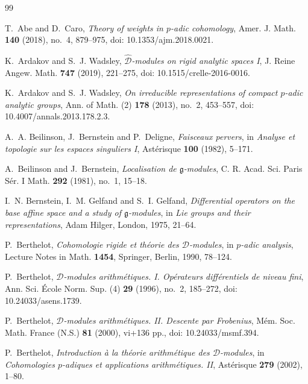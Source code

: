 \documentclass[11pt]{amsart}
\theoremstyle{plain}
\theoremstyle{definition}
\theoremstyle{remark}
\begin{document}
\begin{thebibliography}{99}


T.~Abe and D.~Caro,
\emph{Theory of weights in \(p\)-adic cohomology},
Amer. J. Math. \textbf{140} (2018), no.~4, 879--975,
doi: 10.1353/ajm.2018.0021.

K.~Ardakov and S.~J. Wadsley,
\emph{\(\widehat{\mathcal D}\)-modules on rigid analytic spaces I},
J. Reine Angew. Math. \textbf{747} (2019), 221--275,
doi: 10.1515/crelle-2016-0016.

K.~Ardakov and S.~J. Wadsley,
\emph{On irreducible representations of compact \(p\)-adic analytic groups},
Ann. of Math. (2) \textbf{178} (2013), no.~2, 453--557,
doi: 10.4007/annals.2013.178.2.3.

A.~A. Beilinson, J.~Bernstein and P.~Deligne,
\emph{Faisceaux pervers},
in \emph{Analyse et topologie sur les espaces singuliers I},
Ast\'erisque \textbf{100} (1982), 5--171.

A.~Beilinson and J.~Bernstein,
\emph{Localisation de \(\mathfrak g\)-modules},
C. R. Acad. Sci. Paris S\'er. I Math. \textbf{292} (1981), no.~1, 15--18.

I.~N. Bernstein, I.~M. Gelfand and S.~I. Gelfand,
\emph{Differential operators on the base affine space and a study of \(\mathfrak g\)-modules},
in \emph{Lie groups and their representations}, Adam Hilger, London, 1975,
21--64.

P.~Berthelot,
\emph{Cohomologie rigide et th\'eorie des \(\mathcal D\)-modules},
in \emph{\(p\)-adic analysis}, Lecture Notes in Math. \textbf{1454}, Springer,
Berlin, 1990, 78--124.

P.~Berthelot,
\emph{\(\mathcal D\)-modules arithm\'etiques. I. Op\'erateurs diff\'erentiels de niveau fini},
Ann. Sci. \'Ecole Norm. Sup. (4) \textbf{29} (1996), no.~2, 185--272,
doi: 10.24033/asens.1739.

P.~Berthelot,
\emph{\(\mathcal D\)-modules arithm\'etiques. II\@. Descente par Frobenius},
M\'em. Soc. Math. France (N.S.) \textbf{81} (2000), vi+136 pp.,
doi: 10.24033/msmf.394.

P.~Berthelot,
\emph{Introduction \`a la th\'eorie arithm\'etique des \(\mathcal D\)-modules},
in \emph{Cohomologies \(p\)-adiques et applications arithm\'etiques. II},
Ast\'erisque \textbf{279} (2002), 1--80.


\end{thebibliography}
\end{document}

